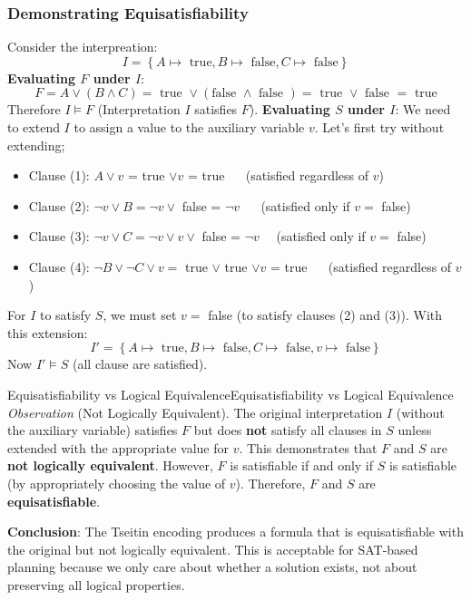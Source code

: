 \documentclass[a4paper]{article}
\theoremstyle{definition}
\begin{document}
\subsubsection{Demonstrating Equisatisfiability}
Consider the interpreation:
\[
  I = \left\{ A \mapsto \text{ true}, B \mapsto \text{ false}, C \mapsto \text{ false} \right\}
\]
\textbf{Evaluating \( F \) under \( I \)}:
\[
  F = A \vee (B \wedge C) = \text{ true } \vee (\text{false } \wedge \text{ false }) = \text{ true } \vee \text{ false } = \text{ true}
\]
Therefore \( I \models F \) (Interpretation $I$ satisfies $F$).
\vspace{1em}
\noindent
\newline 
\textbf{Evaluating \( S \) under \( I \)}:
\vspace{1em}
\noindent
\newline 
We need to extend \( I \) to assign a value to the auxiliary variable \( v \). Let's first try without extending;
\begin{itemize}
    \item Clause (1): \( A \vee v \) = true \( \vee v \) = true \( \quad \) (satisfied regardless of $v$)
    \item Clause (2): \( \lnot v \vee B = \lnot v \vee \) false = \( \lnot v \) \( \quad \) (satisfied only if $v =$ false)
    \item Clause (3): \( \lnot v \vee C = \lnot v \vee v \vee \) false = \( \lnot v \quad \) (satisfied only if $v =$ false)
    \item Clause (4): \( \lnot B \vee \lnot C \vee v = \) true \( \vee \) true \( \vee v \) = true \( \quad \) (satisfied regardless of $v$) 
\end{itemize}
For \( I \) to satisfy \( S \), we must set \( v = \) false (to satisfy clauses (2) and (3)). With this extension:
\[
  I' = \left\{ A \mapsto \text{ true}, B \mapsto \text{ false}, C \mapsto \text{ false}, v \mapsto \text{ false} \right\}
\]
Now \( I' \models S \) (all clause are satisfied).
\begin{definition}{Equisatisfiability vs Logical Equivalence}{Equisatisfiability vs Logical Equivalence}
\textit{Observation} (Not Logically Equivalent). The original interpretation \( I \) (without the auxiliary variable) satisfies 
\( F \) but does \textbf{not} satisfy all clauses in \( S \) unless extended with the appropriate value for \( v \). 
This demonstrates that \( F \) and \( S \) are \textbf{not logically equivalent}. However, \( F \) is satisfiable 
if and only if \( S \) is satisfiable (by appropriately choosing the value of $v$). Therefore, \( F \) and \( S \) are \textbf{equisatisfiable}.
\end{definition}
\textbf{Conclusion}: The Tseitin encoding produces a formula that is equisatisfiable with the original but not logically equivalent.
This is acceptable for SAT-based planning because we only care about whether a solution exists, not about preserving all logical properties.
\end{document}
